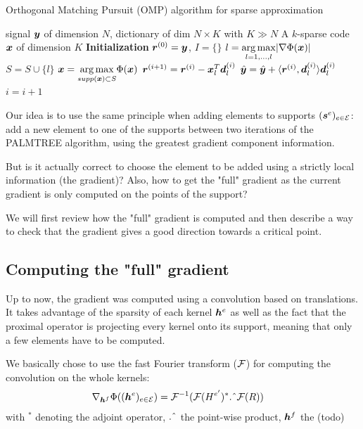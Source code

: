 \begin{algorithm}[!ht]
    \caption{Orthogonal Matching Pursuit (OMP) algorithm for sparse approximation}\label{alg_omp}
  \begin{algorithmic}[1]
    \Input signal $\bm{y}$ of dimension $N$, dictionary of dim $N \times K$ with $K \gg N$
    \Output A $k$-sparse code $\bm{x}$ of dimension $K$
    \State \textbf{Initialization} $\bm{r}^{(0)} = \bm{y}$, $I=\{\}$
      \State $l =  \underset{l = 1,\dots,l}{\arg\max} | \nabla \Phi(\bm{x}) |$ \label{alg_omp_pick_correlation}
      \State $S = S \cup \{l\}$
      \State $\bm{x} = \underset{supp(\bm{x}) \subset S}{\arg\max} \Phi(\bm{x})$
      \State $\bm{r}^{(i+1)} = \bm{r}^{(i)}-\bm{x}_l^T \bm{d}_l^{(i)}$
      \State $\hat{\bm{y}} = \hat{\bm{y}}+\langle \bm{r}^{(i)}, \bm{d}_{l}^{(i)} \rangle \bm{d}_{l}^{(i)}$
      \State $i = i + 1$
    \EndWhile
  \end{algorithmic}
\end{algorithm}

Our idea is to use the same principle when adding elements to supports $(\bm{s}^e)_{e \in \mathcal E}$: add a new element to one of the supports between two iterations of the PALMTREE algorithm, using the greatest gradient component information.

But is it actually correct to choose the element to be added using a strictly local information (the gradient)? Also, how to get the "full" gradient as the current gradient is only computed on the points of the support?

We will first review how the "full" gradient is computed and then describe a way to check that the gradient gives a good direction towards a critical point.


\subsection{Computing the "full" gradient}
Up to now, the gradient was computed using a convolution based on translations. It takes advantage of the sparsity of each kernel $\bm{h}^e$ as well as the fact that the proximal operator is projecting every kernel onto its support, meaning that only a few elements have to be computed.

We basically chose to use the fast Fourier transform (${\mathcal F}$) for computing the convolution on the whole kernels:
\begin{align*}
	\nabla_{\bm{h}^f} \Phi((\bm{h}^e)_{e \in \mathcal E})&= {\mathcal F}^{-1}({\mathcal F}(H^{e'})^* \text{.\^{}} {\mathcal F}(R))
\end{align*}
with ${}^*$ denoting the adjoint operator, $\text{.\^{}}$ the point-wise product, $\bm{h}^{f}$ the (todo) %

